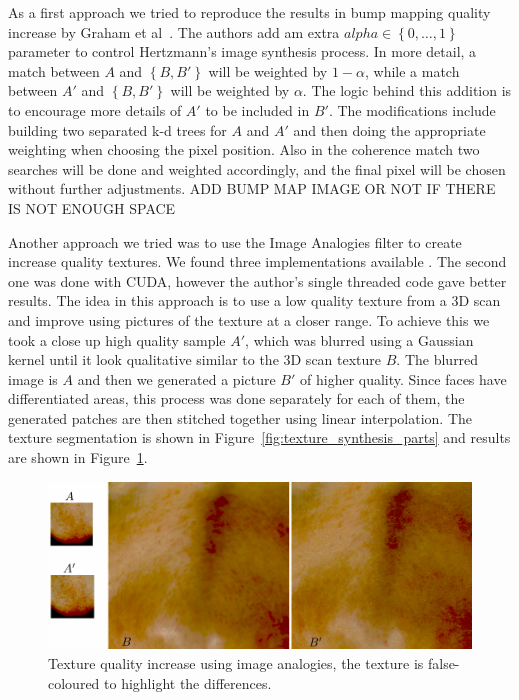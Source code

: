 \documentclass[11pt]{report}
\begin{document}
As a first approach we tried to reproduce the results in bump mapping quality increase by Graham et al~\cite{Graham2013}.
The authors add am extra $alpha \in \left\lbrace 0, \ldots, 1 \right\rbrace$ parameter to control Hertzmann's image synthesis process.
In more detail, a match between $A$ and $\left\lbrace B,B' \right\rbrace$ will be weighted by $1 - \alpha$, while a match between $A'$ and $\left\lbrace B,B' \right\rbrace$ will be weighted by $\alpha$.
The logic behind this addition is to encourage more details of $A'$ to be included in $B'$.
The modifications include building two separated k-d trees for $A$ and $A'$ and then doing the appropriate weighting when choosing the pixel position.
Also in the coherence match two searches will be done and weighted accordingly, and the final pixel will be chosen without further adjustments.
ADD BUMP MAP IMAGE OR NOT IF THERE IS NOT ENOUGH SPACE

Another approach we tried was to use the Image Analogies filter to create increase quality textures.
We found three implementations available \cite{ImAnSingleThreadWeb, ImAnCudaWeb, ImAnHertzmannWeb}.
The second one was done with CUDA, however the author's single threaded code gave better results.
The idea in this approach is to use a low quality texture from a 3D scan and improve using pictures of the texture at a closer range.
To achieve this we took a close up high quality sample $A'$, which was blurred using a Gaussian kernel until it look qualitative similar to the 3D scan texture $B$.
The blurred image is $A$ and then we generated a picture $B'$ of higher quality.
Since faces have differentiated areas, this process was done separately for each of them, the generated patches are then stitched together using linear interpolation.
The texture segmentation is shown in Figure~\ref{fig:texture_synthesis_parts} and results are shown in Figure~\ref{fig:texture_synthesis}.

\begin{figure}[htbp!]
\centering
\includegraphics[width=\textwidth]{img/texture_synthesis}
	\caption{ Texture quality increase using image analogies, the texture is false-coloured to highlight the differences.}
	\label{fig:texture_synthesis}
\end{figure}
\end{document}
